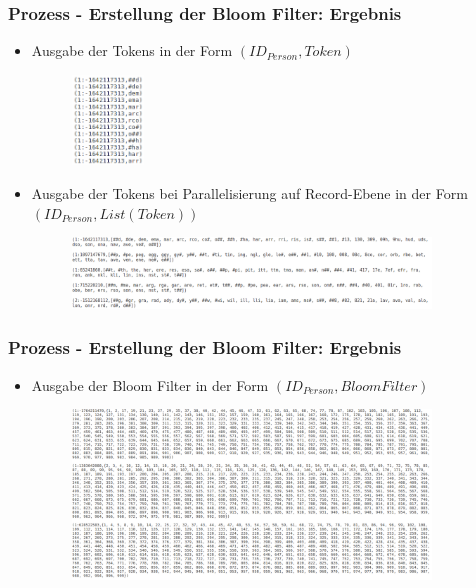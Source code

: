 \documentclass{beamer}
\begin{document}
    \begin{frame}
    		\frametitle{Prozess - Erstellung der Bloom Filter: Ergebnis}
    		\begin{itemize}
    			\item Ausgabe der Tokens in der Form $(ID_{Person}, Token)$
    				\begin{figure}[H]
    					\includegraphics[width=0.18\textwidth]{graphics/tokens_1.png}
    				\end{figure}
    			\item Ausgabe der Tokens bei Parallelisierung auf Record-Ebene in der Form
    			$(ID_{Person}, List(Token))$
    				\begin{figure}[H]
    					\includegraphics[width=0.9\textwidth]{graphics/tokens_2.png}
    				\end{figure}
    		\end{itemize}
    \end{frame}
   
    \begin{frame}
    		\frametitle{Prozess - Erstellung der Bloom Filter: Ergebnis}
    		\begin{itemize}
    			\item Ausgabe der Bloom Filter in der Form $(ID_{Person}, BloomFilter)$
    				\begin{figure}[H]
    					\includegraphics[width=0.9\textwidth]{graphics/bloomfilter.png}
    				\end{figure}
    		\end{itemize}
    \end{frame}
    
\end{document}
